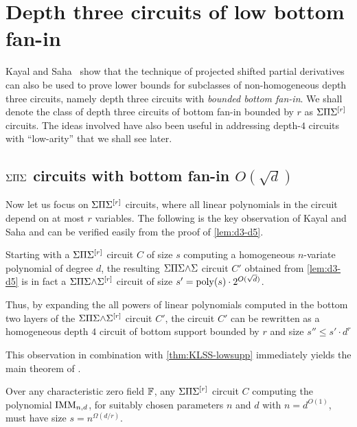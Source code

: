 \chapter{Depth three circuits of low bottom fan-in}

Kayal and Saha~\cite{KayalSaha14} show that the technique of projected shifted partial derivatives can also be used to prove lower bounds for subclasses of non-homogeneous depth three circuits, namely depth three circuits with \emph{bounded bottom fan-in}.
We shall denote the class of depth three circuits of bottom fan-in bounded by $r$ as $\Sigma\Pi\Sigma^{[r]}$ circuits.
The ideas involved have also been useful in addressing depth-$4$ circuits with ``low-arity'' \cite{KumarSaraf15,KayalSaha15} that we shall see later. 

\section{$\Sigma\Pi\Sigma$ circuits with bottom fan-in $O(\sqrt{d})$}

Now let us focus on $\Sigma\Pi\Sigma^{[r]}$ circuits, where all linear polynomials in the circuit depend on at most $r$ variables.
The following is the key observation of Kayal and Saha \cite{KayalSaha14} and can be verified easily from the proof of \autoref{lem:d3-d5}.

\begin{observation}
  Starting with a $\Sigma\Pi\Sigma^{[r]}$ circuit $C$ of size $s$ computing a homogeneous $n$-variate polynomial of degree $d$, the resulting $\Sigma\Pi\Sigma\mathord{\wedge}\Sigma$ circuit $C'$ obtained from \autoref{lem:d3-d5} is in fact a $\Sigma\Pi\Sigma\mathord{\wedge}\Sigma^{[r]}$ circuit of size $s' = \operatorname{poly}(s) \cdot 2^{O(\sqrt{d})}$.

  Thus, by expanding the all powers of linear polynomials computed in the bottom two layers of the $\Sigma\Pi\Sigma\mathord{\wedge}\Sigma^{[r]}$ circuit $C'$, the circuit $C'$ can be rewritten as a homogeneous depth $4$ circuit of bottom support bounded by $r$ and size $s'' \leq s' \cdot d^r$
\end{observation}

This observation in combination with \autoref{thm:KLSS-lowsupp} immediately yields the main theorem of \cite{KayalSaha14}.

\begin{theorem}\label{thm:kaysaha-main}
  Over any characteristic zero field $\mathbb{F}$, any $\Sigma\Pi\Sigma^{[r]}$ circuit
  $C$ computing the polynomial $\operatorname{\mathrm{IMM}}_{n,d}$, for suitably chosen
  parameters $n$ and $d$ with $n = d^{O(1)}$, must have size $s =
  n^{\Omega(d/r)}$. 
\end{theorem}


